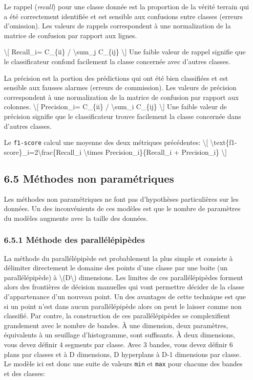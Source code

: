 \documentclass[
]{article}
\begin{document}
Le rappel (\emph{recall}) pour une classe donnée est la proportion de la
vérité terrain qui a été correctement identifiée et est sensible aux
confusions entre classes (erreurs d'omission). Les valeurs de rappels
correspondent à une normalization de la matrice de confusion par rapport
aux lignes.

{\textbackslash{[} Recall\_i= C\_\{ii\} / \textbackslash sum\_j
C\_\{ij\} \textbackslash{]}} Une faible valeur de rappel signifie que le
classificateur confond facilement la classe concernée avec d'autres
classes.

La précision est la portion des prédictions qui ont été bien classifiées
et est sensible aux fausses alarmes (erreurs de commission). Les valeurs
de précision correspondent à une normalization de la matrice de
confusion par rapport aux colonnes. {\textbackslash{[} Precision\_i=
C\_\{ii\} / \textbackslash sum\_i C\_\{ij\} \textbackslash{]}} Une
faible valeur de précision signifie que le classificateur trouve
facilement la classe concernée dans d'autres classes.

Le \texttt{f1-score} calcul une moyenne des deux métriques précédentes:
{\textbackslash{[}
\textbackslash text\{f1-score\}\_i=2\textbackslash frac\{Recall\_i
\textbackslash times Precision\_i\}\{Recall\_i + Precision\_i\}
\textbackslash{]}}

\subsection{\texorpdfstring{{6.5} Méthodes non
paramétriques}{6.5 Méthodes non paramétriques}}\label{muxe9thodes-non-paramuxe9triques}

Les méthodes non paramétriques ne font pas d'hypothèses particulières
sur les données. Un des inconvénients de ces modèles est que le nombre
de paramètres du modèles augmente avec la taille des données.

\label{sec-0511}
\subsubsection{\texorpdfstring{{6.5.1} Méthode des
parallélépipèdes}{6.5.1 Méthode des parallélépipèdes}}\label{muxe9thode-des-paralluxe9luxe9pipuxe8des}

La méthode du parallélépipède est probablement la plus simple et
consiste à délimiter directement le domaine des points d'une classe par
une boite (un parallélépipède) à {\textbackslash(D\textbackslash)}
dimensions. Les limites de ces parallélépipèdes forment alors des
frontières de décision manuelles qui vont permettre décider de la classe
d'appartenance d'un nouveau point. Un des avantages de cette technique
est que si un point n'est dans aucun parallélépipède alors on peut le
laisser comme non classifié. Par contre, la construction de ces
parallélépipèdes se complexifient grandement avec le nombre de bandes. À
une dimension, deux paramètres, équivalents à un seuillage
d'histogramme, sont suffisants. À deux dimensions, vous devez définir 4
segments par classe. Avec 3 bandes, vous devez définir 6 plans par
classes et à D dimensions, D hyperplans à D-1 dimensions par classe. Le
modèle ici est donc une suite de valeurs \texttt{min} et \texttt{max}
pour chacune des bandes et des classes:
\end{document}
